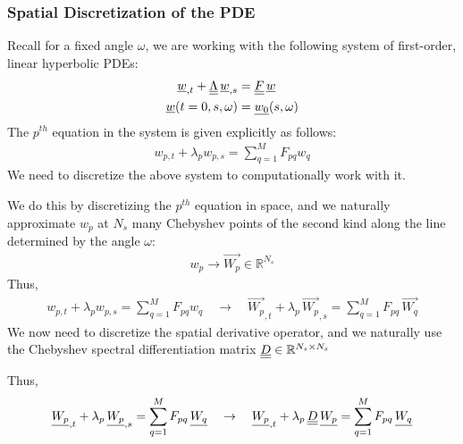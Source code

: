 \subsubsection{Spatial Discretization of the PDE}

Recall for a fixed angle $\omega$, we are working with the following system of first-order, linear hyperbolic PDEs:
\begin{align*}
    {\underline{w}}_{, t} + {\underline{\underline{\Lambda}}} \, {\underline{w}}_{, s} & = {\underline{\underline{F}}} \, {\underline{w}} \\
    {\underline{w}}(t = 0, s, \omega) & = {\underline{w_{0}}}(s, \omega) 
\end{align*}
The $p^{th}$ equation in the system is given explicitly as follows:
\begin{align*}
    w_{p, t} + \lambda_{p} w_{p, s} = \sum_{q=1}^{M} F_{pq} w_{q}
\end{align*}
We need to discretize the above system to computationally work with it.
\par 
We do this by discretizing the $p^{th}$ equation in space, and we naturally approximate $w_{p}$ at $N_{s}$ many Chebyshev points of the second kind along the line determined by the angle $\omega$:
\begin{align}
    w_{p} \rightarrow \vec{W_{p}} \in \mathbb{R}^{N_{s}}
\end{align}
Thus,
\begin{align}
     w_{p, t} + \lambda_{p} w_{p, s} = \sum_{q=1}^{M} F_{pq} w_{q} \quad \rightarrow \quad 
    \vec{W_{p}}_{, t} + \lambda_{p} \, \vec{W_{p}}_{, s} = \sum_{q=1}^{M} F_{pq} \, \vec{W_{q}}
\end{align}
We now need to discretize the spatial derivative operator, and we naturally use the Chebyshev spectral differentiation matrix ${\underline{\underline{D}}} \in \mathbb{R}^{N_{s} \times N_{s}}$
\par
Thus, 
\begin{align}
    {\underline{W_{p}}}_{, t} + \lambda_{p} \, {\underline{W_{p}}}_{, s} = \sum_{q=1}^{M} F_{pq} \, {\underline{W_{q}}} \quad \rightarrow \quad
    {\underline{W_{p}}}_{, t} + \lambda_{p} \, {\underline{\underline{D}}} \, {\underline{W_{p}}} = \sum_{q=1}^{M} F_{pq} \, {\underline{W_{q}}}
\end{align}

